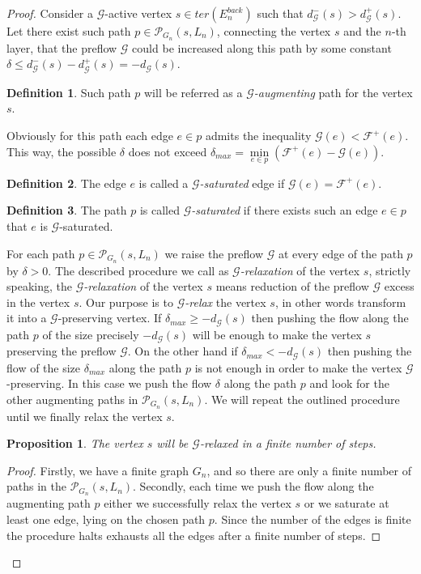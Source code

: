 \documentclass[12pt]{article}
\renewcommand{\cal}[1]{\mathcal{#1}}
\renewcommand{\leq}{\leqslant}
\renewcommand{\geq}{\geqslant}
\newtheorem{prop}{Proposition}
\theoremstyle{definition}
\newtheorem{definition}{Definition}
\newcommand{\flowpos}{\mathcal{F}^{+}}
\newcommand{\ter}{ter}
\newcommand{\eback}{E^{back}}
\newcommand{\gnpaths}{\cal{P}_{G_n}}
\numberwithin{remark}{section}
\numberwithin{theorem}{section}
\numberwithin{prop}{section}
\numberwithin{equation}{section}
\numberwithin{lemma}{section}
\numberwithin{prop_under_lemma}{lemma}
\begin{document}
\begin{proof}
      Consider a $\cal{G}$-active vertex $s \in \ter(\eback_n)$ such that $d_{\cal{G}}^{-}(s) > d_{\cal{G}}^{+}(s)$.
      Let there exist such path $p \in \gnpaths(s, L_n)$, connecting the vertex $s$ and the $n$-th layer, that
        the preflow $\cal{G}$ could be increased along this path by some constant
        $\delta \leq d_{\cal{G}}^{-}(s) - d_{\cal{G}}^{+}(s) = -d_{\cal{G}}(s)$.
      \begin{definition}
        Such path $p$ will be referred as a \emph{$\cal{G}$-augmenting} path for the vertex $s$.
      \end{definition}
      Obviously for this path each edge $e \in p$ admits the inequality $\cal{G}(e) < \flowpos(e)$.
      This way, the possible $\delta$ does not exceed $\delta_{max}=\min\limits_{e \in p}(\flowpos(e) - \cal{G}(e))$.
      \begin{definition}
        The edge $e$ is called a \emph{$\cal{G}$-saturated} edge if $\cal{G}(e) = \flowpos(e)$.
      \end{definition}
      \begin{definition}
        The path $p$ is called \emph{$\cal{G}$-saturated} if there exists such an edge $e \in p$ that $e$ is $\cal{G}$-saturated.
      \end{definition}
      For each path $p \in \gnpaths(s, L_n)$ we raise the preflow $\cal{G}$ at every edge of the path $p$
      by $\delta > 0$.
      The described procedure we call as \emph{$\cal{G}$-relaxation} of the vertex $s$, strictly speaking, the \emph{$\cal{G}$-relaxation}
        of the vertex $s$ means reduction of the preflow $\cal{G}$ excess in the vertex $s$.
      Our purpose is to \emph{$\cal{G}$-relax} the vertex $s$, in other words transform it into a $\cal{G}$-preserving vertex.
      If $\delta_{max} \geq -d_{\cal{G}}(s)$ then pushing the flow along the path $p$ of the size precisely $-d_{\cal{G}}(s)$
        will be enough to make the vertex $s$ preserving the preflow $\cal{G}$.
      On the other hand if $\delta_{max} < -d_{\cal{G}}(s)$ then pushing the flow of the size $\delta_{max}$ along the path $p$ is not enough
        in order to make the vertex $\cal{G}$-preserving.
      In this case we push the flow $\delta$ along the path $p$ and look for the other augmenting paths in $\gnpaths(s, L_n)$.
      We will repeat the outlined procedure until we finally relax the vertex $s$.
      \begin{prop}
        The vertex $s$ will be $\cal{G}$-relaxed in a finite number of steps.
      \end{prop}
      \begin{proof}
        Firstly, we have a finite graph $G_{n}$, and so there are only a finite number of paths in the $\gnpaths(s, L_n)$.
        Secondly, each time we push the flow along the augmenting path $p$ either we successfully relax the vertex $s$
          or we saturate at least one edge, lying on the chosen path $p$.
        Since the number of the edges is finite the procedure halts exhausts all the edges after a finite number of steps.


\end{proof}
\end{proof}
\end{document}
